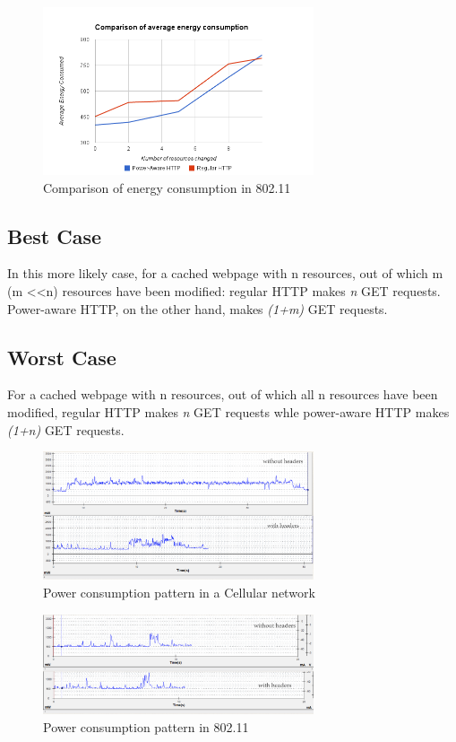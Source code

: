 \documentclass{sigplanconf}
\begin{document}
\begin{figure}[ht!]
\centering
\includegraphics[width=80mm]{avg_energy_wifi.png}
\caption{Comparison of energy consumption in 802.11}
\label{fig:sp_gd_mnist}
\end{figure}


\subsection{Best Case}

In this more likely case, for a cached webpage with n resources, out of which m (m \textless \textless n) resources have been modified: regular HTTP makes {\it n} GET requests. Power-aware HTTP, on the other hand, makes {\it (1+m)} GET requests.

\subsection{Worst Case}

For a cached webpage with n resources, out of which all n resources have been modified, regular HTTP makes {\it n} GET requests whle power-aware HTTP makes {\it (1+n)} GET requests.

\begin{figure}[ht!]
\centering
\includegraphics[width=80mm]{Cellular_combined.png}
\caption{Power consumption pattern in a Cellular network }
\label{fig:sp_gd_mnist}
\end{figure}

\begin{figure}[ht!]	
\centering
\includegraphics[width=80mm]{Wifi_combined.png}
\caption{Power consumption pattern in 802.11}
\label{fig:sp_gd_mnist}
\end{figure}
\end{document}
